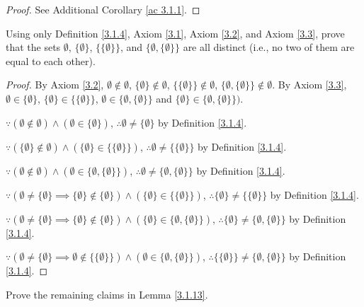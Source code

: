 \begin{proof}
See Additional Corollary \ref{ac 3.1.1}.
\end{proof}

\begin{exercise}\label{ex 3.1.2}
Using only Definition \ref{3.1.4}, Axiom \ref{3.1}, Axiom \ref{3.2}, and Axiom \ref{3.3}, prove that the sets \(\emptyset\), \(\{\emptyset\}\), \(\{\{\emptyset\}\}\), and \(\{\emptyset, \{\emptyset\}\}\) are all distinct
(i.e., no two of them are equal to each other).
\end{exercise}

\begin{proof}
By Axiom \ref{3.2}, \(\emptyset \notin \emptyset\), \(\{\emptyset\} \notin \emptyset\), \(\{\{\emptyset\}\} \notin \emptyset\), \(\{\emptyset, \{\emptyset\}\} \notin \emptyset\).
By Axiom \ref{3.3}, \(\emptyset \in \{\emptyset\}\), \(\{\emptyset\} \in \{\{\emptyset\}\}\), \(\emptyset \in \{\emptyset, \{\emptyset\}\}\) and \(\{\emptyset\} \in \{\emptyset, \{\emptyset\}\})\).

\(\because (\emptyset \notin \emptyset) \land (\emptyset \in \{\emptyset\})\), \(\therefore \emptyset \neq \{\emptyset\}\) by Definition \ref{3.1.4}.

\(\because (\{\emptyset\} \notin \emptyset) \land (\{\emptyset\} \in \{\{\emptyset\}\})\), \(\therefore \emptyset \neq \{\{\emptyset\}\}\) by Definition \ref{3.1.4}.

\(\because (\emptyset \notin \emptyset) \land (\emptyset \in \{\emptyset, \{\emptyset\}\})\), \(\therefore \emptyset \neq \{\emptyset, \{\emptyset\}\}\) by Definition \ref{3.1.4}.

\(\because (\emptyset \neq \{\emptyset\} \implies \{\emptyset\} \notin \{\emptyset\}) \land (\{\emptyset\} \in \{\{\emptyset\}\})\), \(\therefore \{\emptyset\} \neq \{\{\emptyset\}\}\) by Definition \ref{3.1.4}.

\(\because (\emptyset \neq \{\emptyset\} \implies \{\emptyset\} \notin \{\emptyset\}) \land (\{\emptyset\} \in \{\emptyset, \{\emptyset\}\})\), \(\therefore \{\emptyset\} \neq \{\emptyset, \{\emptyset\}\}\) by Definition \ref{3.1.4}.

\(\because (\emptyset \neq \{\emptyset\} \implies \emptyset \notin \{\{\emptyset\}\}) \land (\emptyset \in \{\emptyset, \{\emptyset\}\})\), \(\therefore \{\{\emptyset\}\} \neq \{\emptyset, \{\emptyset\}\}\) by Definition \ref{3.1.4}.
\end{proof}

\begin{exercise}\label{ex 3.1.3}
Prove the remaining claims in Lemma \ref{3.1.13}.
\end{exercise}

